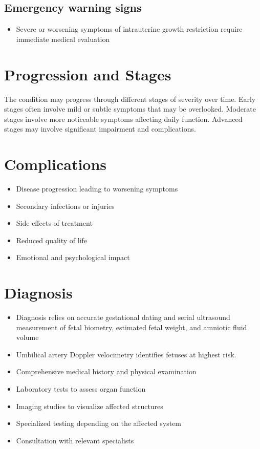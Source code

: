 \subsection{Emergency warning signs}
\begin{itemize}[noitemsep]
  \item Severe or worsening symptoms of intrauterine growth restriction require immediate medical evaluation
\end{itemize}
\section{Progression and Stages}
The condition may progress through different stages of severity over time. Early stages often involve mild or subtle symptoms that may be overlooked. Moderate stages involve more noticeable symptoms affecting daily function. Advanced stages may involve significant impairment and complications.
\section{Complications}
\begin{itemize}[noitemsep]
  \item Disease progression leading to worsening symptoms
  \item Secondary infections or injuries
  \item Side effects of treatment
  \item Reduced quality of life
  \item Emotional and psychological impact
\end{itemize}
\section{Diagnosis}
\begin{itemize}[noitemsep]
  \item Diagnosis relies on accurate gestational dating and serial ultrasound measurement of fetal biometry, estimated fetal weight, and amniotic fluid volume
  \item Umbilical artery Doppler velocimetry identifies fetuses at highest risk.
  \item Comprehensive medical history and physical examination
  \item Laboratory tests to assess organ function
  \item Imaging studies to visualize affected structures
  \item Specialized testing depending on the affected system
  \item Consultation with relevant specialists
\end{itemize}
